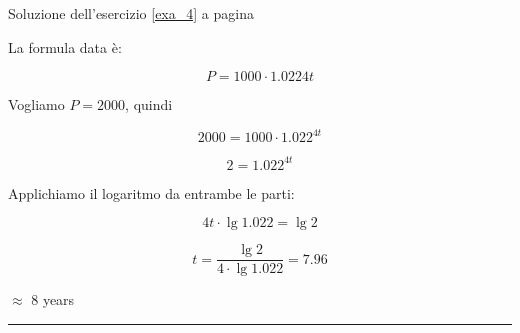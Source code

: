\begin{minipage}{\textwidth}
Soluzione dell'esercizio \ref{exa_4} a pagina \pageref{exa_4}\label{sola_4}

La formula data è: 

\begin{equation*}
P = 1000 \cdot 1.0224t
\end{equation*}

Vogliamo $P=2000$, quindi 

\begin{equation*}
2000 = 1000 \cdot 1.022^{4t}
\end{equation*}

\begin{equation*}
2= 1.022^{4t}
\end{equation*}

Applichiamo il logaritmo da entrambe le parti:

\begin{equation*}
4t\cdot \lg 1.022 = \lg 2
\end{equation*}


\begin{equation*}
t=\frac{
\lg 2
}{
4\cdot\lg 1.022
} = 7.96
\end{equation*}

$\approx$ 8 years

\end{minipage}

\vspace{1cm}
\hrule
\vspace{1cm}



